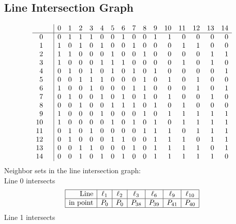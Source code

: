 \documentclass{article}
\begin{document}
{\subsection*{Line Intersection Graph}
{\arraycolsep=1pt
$$
\begin{array}{rr|*{15}r}
 &  & 0 & 1 & 2 & 3 & 4 & 5 & 6 & 7 & 8 & 9 & 10 & 11 & 12 & 13 & 14\\
\hline
0 &  & 0 & 1 & 1 & 1 & 0 & 0 & 1 & 0 & 0 & 1 & 1 & 0 & 0 & 0 & 0\\
1 &  & 1 & 0 & 1 & 0 & 1 & 0 & 0 & 1 & 0 & 0 & 0 & 1 & 1 & 0 & 0\\
2 &  & 1 & 1 & 0 & 0 & 0 & 1 & 0 & 0 & 1 & 0 & 0 & 0 & 0 & 1 & 1\\
3 &  & 1 & 0 & 0 & 0 & 1 & 1 & 1 & 0 & 0 & 0 & 0 & 1 & 0 & 1 & 0\\
4 &  & 0 & 1 & 0 & 1 & 0 & 1 & 0 & 1 & 0 & 1 & 0 & 0 & 0 & 0 & 1\\
5 &  & 0 & 0 & 1 & 1 & 1 & 0 & 0 & 0 & 1 & 0 & 1 & 0 & 1 & 0 & 0\\
6 &  & 1 & 0 & 0 & 1 & 0 & 0 & 0 & 1 & 1 & 0 & 0 & 0 & 1 & 0 & 1\\
7 &  & 0 & 1 & 0 & 0 & 1 & 0 & 1 & 0 & 1 & 0 & 1 & 0 & 0 & 1 & 0\\
8 &  & 0 & 0 & 1 & 0 & 0 & 1 & 1 & 1 & 0 & 1 & 0 & 1 & 0 & 0 & 0\\
9 &  & 1 & 0 & 0 & 0 & 1 & 0 & 0 & 0 & 1 & 0 & 1 & 1 & 1 & 1 & 1\\
10 &  & 1 & 0 & 0 & 0 & 0 & 1 & 0 & 1 & 0 & 1 & 0 & 1 & 1 & 1 & 1\\
11 &  & 0 & 1 & 0 & 1 & 0 & 0 & 0 & 0 & 1 & 1 & 1 & 0 & 1 & 1 & 1\\
12 &  & 0 & 1 & 0 & 0 & 0 & 1 & 1 & 0 & 0 & 1 & 1 & 1 & 0 & 1 & 1\\
13 &  & 0 & 0 & 1 & 1 & 0 & 0 & 0 & 1 & 0 & 1 & 1 & 1 & 1 & 0 & 1\\
14 &  & 0 & 0 & 1 & 0 & 1 & 0 & 1 & 0 & 0 & 1 & 1 & 1 & 1 & 1 & 0\\
\end{array}
$$
}%
Neighbor sets in the line intersection graph:\\
Line 0 intersects 
$$
\begin{array}{|r*{6}{|c}|}
\hline
\mbox{Line}  & \ell_{1} & \ell_{2} & \ell_{3} & \ell_{6} & \ell_{9} & \ell_{10}\\
\hline
\mbox{in point}  & P_{0} & P_{0} & P_{38} & P_{39} & P_{41} & P_{40}\\
\hline
\end{array}
$$
Line 1 intersects 
$$
\begin{array}{|r*{6}{|c}|}

\end{array}$$}
\end{document}
